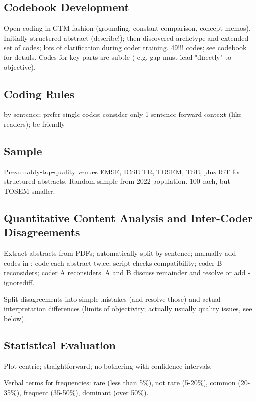 \documentclass[10pt,journal,compsoc]{IEEEtran}
\begin{document}
\subsection{Codebook Development}

\noindent
Open coding in GTM fashion (grounding, constant comparison, concept memos).
Initially structured abstract (describe!); then discovered archetype and extended set of codes; lots of clarification during coder training.
49!!! codes; see codebook for details.
Codes for key parts are subtle ( e.g. gap must lead "directly" to objective).


\subsection{Coding Rules}

\noindent
by sentence; prefer single codes; consider only 1 sentence forward context (like readers); be friendly


\subsection{Sample}

\noindent
Presumably-top-quality venues EMSE, ICSE TR, TOSEM, TSE,
plus IST for structured abstracts.
Random sample from 2022 population.
100 each, but TOSEM smaller.


\subsection{Quantitative Content Analysis and Inter-Coder Disagreements}

\noindent
Extract abstracts from PDFs; automatically split by sentence; manually add codes in {{}};
code each abstract twice; script checks compatibility; coder B reconsiders; coder A reconsiders;
A and B discuss remainder and resolve or add -ignorediff.

Split disagreements into simple mistakes (and resolve those) and actual interpretation differences
(limits of objectivity; actually usually quality issues, see below).


\subsection{Statistical Evaluation}

\noindent
Plot-centric; straightforward; no bothering with confidence intervals.

Verbal terms for frequencies: 
rare (less than 5\%),
not rare (5-20\%),
common (20-35\%),
frequent (35-50\%),
dominant (over 50\%).
\end{document}
